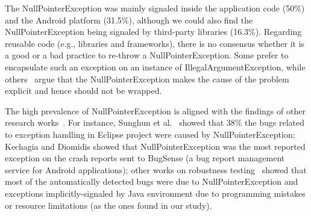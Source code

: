 \documentclass[conference]{IEEEtran}
\begin{document}
 The NullPointerException was mainly signaled inside the application code (50\%) and the Android platform (31.5\%),
 although we could also find the NullPointerException being signaled by third-party libraries (16.3\%). 
Regarding reusable code (e.g., libraries and frameworks), there is no consensus whether it is a good or a bad practice to 
re-throw a NullPointerException. Some prefer to encapsulate such an exception on
an instance of IllegalArgumentException, while others~\cite{bloch2008effective} argue that the
NullPointerException makes the cause of the problem explicit and hence 
should not be wrapped.

The high prevalence of NullPointerException is aligned with the findings of other research
works~\cite{kim2013predicting,fraser20131600,csallner2004jcrasher,kechagia2014}. For instance, Sunghun et
al.~\cite{kim2013predicting} showed that 38\% the bugs related to exception handling in Eclipse project
 were caused by NullPointerException; Kechagia and Diomidis showed that NullPointerException was the  
most reported exception on the crash reports sent to BugSense (a bug report 
management service for Android applications); 
other works on robustness testing~\cite{maji2012empirical,csallner2004jcrasher} showed that most of the automatically 
detected bugs were due to NullPointerException and exceptions implicitly-signaled by Java 
environment due to programming mistakes or resource limitations
 (as the ones found in our study).


\end{document}
